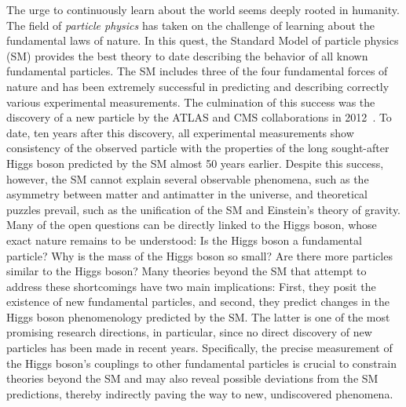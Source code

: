 
The urge to continuously learn about the world seems deeply rooted in humanity.
The field of \emph{particle physics} has taken on the challenge of learning about the fundamental laws of nature. 
In this quest, the Standard Model of particle physics (SM) provides the best theory to date describing the behavior of all known fundamental particles. 
The SM includes three of the four fundamental forces of nature and has been extremely successful in predicting and describing correctly various experimental measurements. 
The culmination of this success was the discovery of a new particle by the ATLAS and CMS collaborations in 2012~\cite{HIGG-2012-27,CMS-HIG-12-028}.
To date, ten years after this discovery, all experimental measurements show consistency of the observed particle with the properties of the long sought-after Higgs boson predicted by the SM almost 50 years earlier.
Despite this success, however, the SM cannot explain several observable phenomena, such as the asymmetry between matter and antimatter in the universe, and theoretical puzzles prevail, such as the unification of the SM and Einstein's theory of gravity.
Many of the open questions can be directly linked to the Higgs boson, whose exact nature remains to be understood: Is the Higgs boson a fundamental particle? Why is the mass of the Higgs boson so small? Are there more particles similar to the Higgs boson? 
Many theories beyond the SM that attempt to address these shortcomings have two main implications: First, they posit the existence of new fundamental particles, and second, they predict changes in the Higgs boson phenomenology predicted by the SM. The latter is one of the most promising research directions, in particular, since no direct discovery of new particles has been made in recent years. 
Specifically, the precise measurement of the Higgs boson's couplings to other fundamental particles is crucial to constrain theories beyond the SM and may also reveal possible deviations from the SM predictions, thereby indirectly paving the way to new, undiscovered phenomena. 


